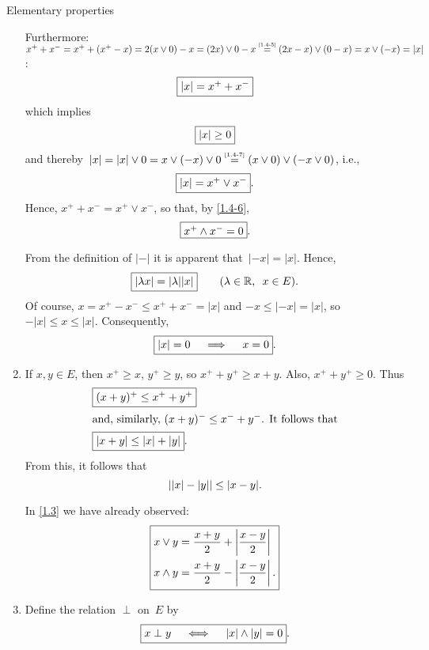 \documentclass[main.tex]{subfiles}
\begin{document}
\begin{psec}{Elementary properties}
\begin{enumerate}
Furthermore:
$x^+ + x^- 
= x^+ + (x^+ - x) 
= 2(x\vee 0) -x
= (2x)\vee 0 -x
\isref{1.4-5} (2x-x)\vee(0-x) = x\vee(-x) = |x|$:
\begin{equation*}
\fbox{$ |x| = x^+ + x^- $}
\end{equation*}
which implies
\begin{equation*}
\fbox{$ |x|\ge 0 $}
\end{equation*}
and 
thereby~$|x|=|x|\vee 0
= x\vee(-x)\vee 0 \isref{1.4-7} (x\vee 0) \vee (-x\vee 0)$,
i.e., 
\begin{equation*}
\fbox{$ |x| = x^+ \vee x^- $}
\textnormal{.}
\end{equation*}
Hence, $x^+ + x^- = x^+ \vee x^-$,
so that, 
by \ref{1.4-6},
\begin{equation*}
\fbox{$ x^+ \wedge x^- = 0 $} 
\textnormal{.}
\end{equation*}

From the definition of $|-|$
it is apparent that~$|-x|=|x|$.
Hence, 
\begin{equation*}
\fbox{$ |\lambda x|=|\lambda| |x| $} 
  \qquad (\lambda\in\mathbb{R}\textnormal{, }\ x\in E)\textnormal{.}
\end{equation*}
Of course,
$x=x^+ - x^-\leq x^+ + x^- = |x|$
and $-x\leq|-x|=|x|$,
so $-|x|\leq x \leq |x|$.
Consequently,
\begin{equation*}
\fbox{$ |x|=0 \quad \implies \quad x=0 $}
\textnormal{.}
\end{equation*}
%
\item%
\label{1.4-10}
If $x,y\in E$,
then $x^+\geq x$, 
$y^+\geq y$,
so $x^+ + y^+ \geq x+y$.
Also,
$x^+ + y^+\geq 0$.
Thus
\begin{align*}
&\fbox{$ (x+y)^+ \leq x^+ + y^+ $}\\
\intertext{and, 
similarly, 
$(x+y)^- \leq x^- + y^-$.
It follows that}
&\fbox{$ |x+y|\leq|x|+|y| $}
\textnormal{.}
\end{align*}
From this,
it follows that
\begin{equation*}
||x|-|y|| \leq |x-y| 
\textnormal{.}
\end{equation*}

In \ref{1.3} 
we have already observed:
\[ \fbox{$ 
\begin{aligned}
x \vee y 
  &= \frac{x+y}{2} + \left | \frac{x-y}{2} \right | \\
x \wedge y 
  &= \frac{x+y}{2} - \left | \frac{x-y}{2} \right | 
\textnormal{.}
\end{aligned}  $} \]
%
\item
\label{1.4-11}
Define the relation $\perp$ on~$E$ by
\begin{equation*}
\fbox{$ x \perp y \quad \iff \quad |x|\wedge|y|=0 $}
\textnormal{.}
\end{equation*}


\end{enumerate}
\end{psec}
\end{document}

